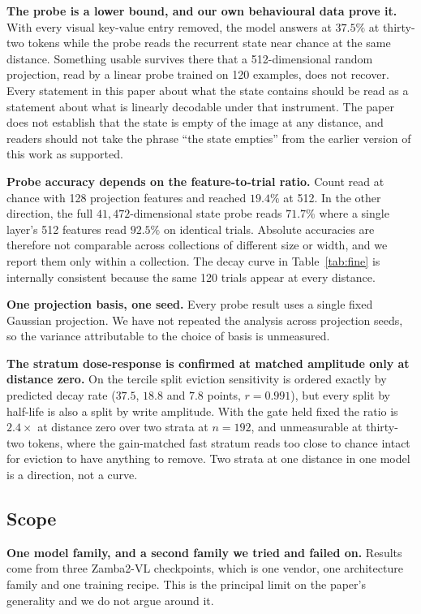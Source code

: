 \documentclass[10pt]{article}
\begin{document}
\textbf{The probe is a lower bound, and our own behavioural data prove it.}
With every visual key-value entry removed, the model answers at $37.5\%$ at
thirty-two tokens while the probe reads the recurrent state near chance at the
same distance. Something usable survives there that a 512-dimensional random
projection, read by a linear probe trained on 120 examples, does not recover.
Every statement in this paper about what the state contains should be read as a
statement about what is linearly decodable under that instrument. The paper does
not establish that the state is empty of the image at any distance, and readers
should not take the phrase ``the state empties'' from the earlier version of
this work as supported.

\textbf{Probe accuracy depends on the feature-to-trial ratio.} Count read at
chance with 128 projection features and reached $19.4\%$ at 512. In the other
direction, the full $41{,}472$-dimensional state probe reads $71.7\%$ where a
single layer's 512 features read $92.5\%$ on identical trials. Absolute
accuracies are therefore not comparable across collections of different size or
width, and we report them only within a collection. The decay curve in
Table~\ref{tab:fine} is internally consistent because the same 120 trials appear
at every distance.

\textbf{One projection basis, one seed.} Every probe result uses a single fixed
Gaussian projection. We have not repeated the analysis across projection seeds,
so the variance attributable to the choice of basis is unmeasured.

\textbf{The stratum dose-response is confirmed at matched amplitude only at
distance zero.} On the tercile split eviction sensitivity is ordered exactly
by predicted decay rate ($37.5$, $18.8$ and $7.8$ points, $r = 0.991$), but
every split by half-life is also a split by write amplitude. With the gate
held fixed the ratio is $2.4\times$ at distance zero over two strata at
$n = 192$, and unmeasurable at thirty-two tokens, where the gain-matched fast
stratum reads too close to chance intact for eviction to have anything to
remove. Two strata at one distance in one model is a direction, not a curve.

\subsection{Scope}

\textbf{One model family, and a second family we tried and failed on.} Results
come from three Zamba2-VL checkpoints, which is one vendor, one architecture
family and one training recipe. This is the principal limit on the paper's
generality and we do not argue around it.
\end{document}
